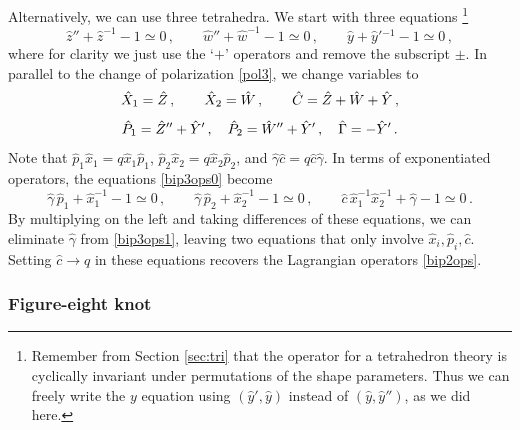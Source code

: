 \documentclass[11pt,letterpaper]{article}
\numberwithin{equation}{section}
\newcommand{\be}{\begin{equation}}
\newcommand{\ee}{\end{equation}}
\begin{document}
Alternatively, we can use three tetrahedra. We start with three equations%
\footnote{Remember from Section \ref{sec:tri} that the operator for a tetrahedron theory is cyclically invariant under permutations of the shape parameters. Thus we can freely write the $y$ equation using $(\hat y',\hat y)$ instead of $(\hat y,\hat y'')$, as we did here.}
%
\be \hat z''+\hat z^{-1}-1\simeq 0\,,\qquad
\hat w''+\hat w^{-1}-1\simeq 0\,,\qquad
\hat y+\hat y'{}^{-1}-1\simeq 0\,, \label{bip3ops0} \ee
%
where for clarity we just use the `$+$' operators and remove the subscript $\pm$. In parallel to the change of polarization \eqref{pol3}, we change variables to
%
\be \hat X_{1} = \hat Z\,,\qquad \hat X_{2}=\hat W\,,\qquad \hat C=\hat Z+\hat W+\hat Y\,, \notag \ee
\be \hat P_{1}=\hat Z''+\hat Y'\,,\quad
\hat P_{2}=\hat W''+\hat Y'\,,\quad
\hat \Gamma = -\hat Y'\,. \notag
\ee
%
Note that $\hat p_1\hat x_1 = q\hat x_1\hat p_1$, $\hat p_2\hat x_2=q\hat x_2\hat p_2$, and $\hat \gamma\hat c= q\hat c\hat \gamma$.
In terms of exponentiated operators, the equations \eqref{bip3ops0} become
%
\be \hat\gamma\,\hat p_{1}+\hat x_{1}^{-1}-1\simeq 0\,,\qquad
\hat\gamma\,\hat p_{2}+\hat x_{2}^{-1}-1\simeq 0\,,\qquad
\hat c\,\hat x_{1}^{-1}\hat x_{2}^{-1}+\hat\gamma -1 \simeq 0\,. \label{bip3ops1}\ee
%
By multiplying on the left and taking differences of these equations, we can eliminate $\hat \gamma$ from \eqref{bip3ops1}, leaving two equations that only involve $\hat x_i,\hat p_i,\hat c$. Setting $\hat c\to q$ in these equations recovers the Lagrangian operators \eqref{bip2ops}.


\subsubsection*{Figure-eight knot}
\end{document}
